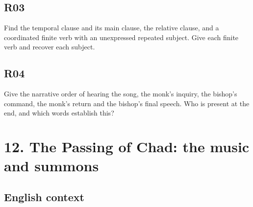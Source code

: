 \par\begin{minipage}{\linewidth}\raggedright
\subsection*{R03}

Find the temporal clause and its main clause, the relative clause, and a coordinated finite verb with an unexpressed repeated subject. Give each finite verb and recover each subject.

\end{minipage}\par\addvspace{4pt}

\par\begin{minipage}{\linewidth}\raggedright
\subsection*{R04}

Give the narrative order of hearing the song, the monk’s inquiry, the bishop’s command, the monk’s return and the bishop’s final speech. Who is present at the end, and which words establish this?

\end{minipage}\par\addvspace{4pt}

\section*{12. The Passing of Chad: the music and summons}

\subsection*{English context}

